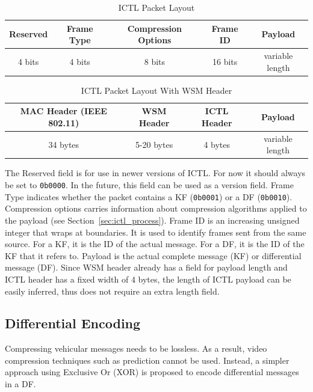 \documentclass[12pt]{report}
\begin{document}
\begin{table}[h]
  \begin{center}
    \begin{tabular}{|c|c|c|c|c|}
      \hline
      Reserved & Frame Type & Compression Options & Frame ID & Payload \\\hline
      4 bits   &  4 bits    & 8 bits              & 16 bits  & variable length \\\hline
    \end{tabular}
    \caption{\label{tab:ictl_layout}ICTL Packet Layout}
  \end{center}
\end{table}
\begin{table}[h]
  \begin{center}
    \begin{tabular}{|c|c|c|c|}
      \hline
      MAC Header (IEEE 802.11) & WSM Header & ICTL Header & Payload \\\hline
      34 bytes            & 5-20 bytes & 4 bytes     &  variable length \\\hline
    \end{tabular}
    \caption{\label{tab:ictl_layout_wsm}ICTL Packet Layout With WSM Header}
  \end{center}
\end{table}

The Reserved field is for use in newer versions of ICTL. For now it should always be set to \texttt{0b0000}. In the future, this field can be used as a version field. Frame Type indicates whether the packet contains a KF (\texttt{0b0001}) or a DF (\texttt{0b0010}). Compression options carries information about compression algorithms applied to the payload (see Section~\ref{sec:ictl_process}). Frame ID is an increasing unsigned integer that wraps at boundaries. It is used to identify frames sent from the same source. For a KF, it is the ID of the actual message. For a DF, it is the ID of the KF that it refers to. Payload is the actual complete message (KF) or differential message (DF). Since WSM header already has a field for payload length and ICTL header has a fixed width of 4 bytes, the length of ICTL payload can be easily inferred, thus does not require an extra length field.

\subsection{Differential Encoding}
\label{sec:ictl_diff}

Compressing vehicular messages needs to be lossless. As a result, video compression techniques such as prediction cannot be used. Instead, a simpler approach using Exclusive Or (XOR) is proposed to encode differential messages in a DF.
\end{document}
